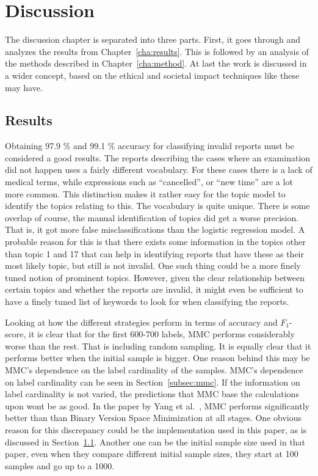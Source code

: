 \chapter{Discussion}
\label{cha:discussion}

The discussion chapter is separated into three parts.
First, it goes through and analyzes the results from Chapter~\ref{cha:results}.
This is followed by an analysis of the methods described in Chapter~\ref{cha:method}.
At last the work is discussed in a wider concept, based on the ethical and societal impact techniques like these may have.

\section{Results}
\label{sec:discussion-results}

Obtaining 97.9 \% and 99.1 \% accuracy for classifying invalid reports must be considered a good results.
The reports describing the cases where an examination did not happen uses a fairly different vocabulary.
For these cases there is a lack of medical terms, while expressions such as ``cancelled'', or ``new time'' are a lot more common.
This distinction makes it rather easy for the topic model to identify the topics relating to this.
The vocabulary is quite unique.
There is some overlap of course, the manual identification of topics did get a worse precision.
That is, it got more false misclassifications than the logistic regression model.
A probable reason for this is that there exists some information in the topics other than topic 1 and 17 that can help in identifying reports that have these as their most likely topic, but still is not invalid.
One such thing could be a more finely tuned notion of prominent topics.
However, given the clear relationship between certain topics and whether the reports are invalid, it might even be sufficient to have a finely tuned list of keywords to look for when classifying the reports.

Looking at how the different strategies perform in terms of accuracy and $F_1$-score, it is clear that for the first 600-700 labels, MMC performs considerably worse than the rest.
That is including random sampling.
It is equally clear that it performs better when the initial sample is bigger.
One reason behind this may be MMC's dependence on the label cardinality of the samples.
MMC's dependence on label cardinality can be seen in Section~\ref{subsec:mmc}.
If the information on label cardinality is not varied, the predictions that MMC base the calculations upon wont be as good.
In the paper by Yang et al\@.~\cite{yang2009effective}, MMC performs significantly better than than Binary Version Space Minimization at all stages.
One obvious reason for this discrepancy could be the implementation used in this paper, as is discussed in Section~\ref{sec:discussion-results}.
Another one can be the initial sample size used in that paper, even when they compare different initial sample sizes, they start at 100 samples and go up to a 1000.

